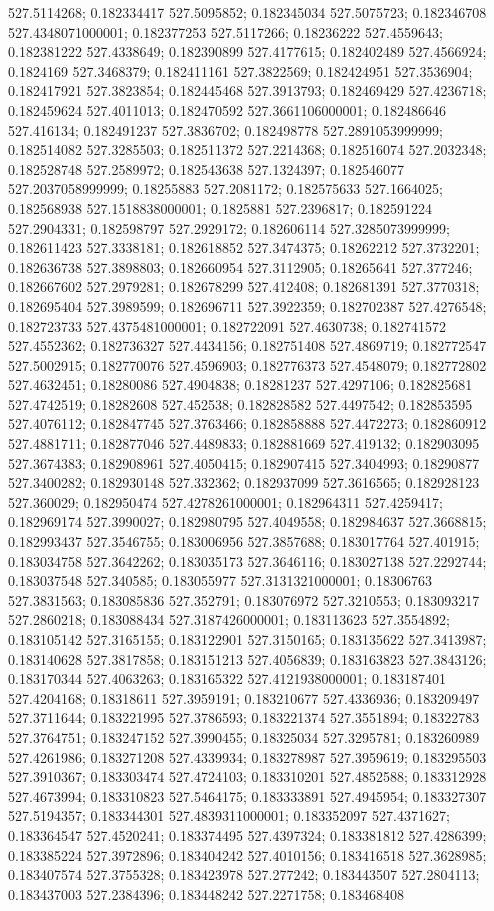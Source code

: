527.5114268; 0.182334417 527.5095852; 0.182345034 527.5075723; 0.182346708 527.4348071000001; 0.182377253 527.5117266; 0.18236222 527.4559643; 0.182381222 527.4338649; 0.182390899 527.4177615; 0.182402489 527.4566924; 0.1824169 527.3468379; 0.182411161 527.3822569; 0.182424951 527.3536904; 0.182417921 527.3823854; 0.182445468 527.3913793; 0.182469429 527.4236718; 0.182459624 527.4011013; 0.182470592 527.3661106000001; 0.182486646 527.416134; 0.182491237 527.3836702; 0.182498778 527.2891053999999; 0.182514082 527.3285503; 0.182511372 527.2214368; 0.182516074 527.2032348; 0.182528748 527.2589972; 0.182543638 527.1324397; 0.182546077 527.2037058999999; 0.18255883 527.2081172; 0.182575633 527.1664025; 0.182568938 527.1518838000001; 0.1825881 527.2396817; 0.182591224 527.2904331; 0.182598797 527.2929172; 0.182606114 527.3285073999999; 0.182611423 527.3338181; 0.182618852 527.3474375; 0.18262212 527.3732201; 0.182636738 527.3898803; 0.182660954 527.3112905; 0.18265641 527.377246; 0.182667602 527.2979281; 0.182678299 527.412408; 0.182681391 527.3770318; 0.182695404 527.3989599; 0.182696711 527.3922359; 0.182702387 527.4276548; 0.182723733 527.4375481000001; 0.182722091 527.4630738; 0.182741572 527.4552362; 0.182736327 527.4434156; 0.182751408 527.4869719; 0.182772547 527.5002915; 0.182770076 527.4596903; 0.182776373 527.4548079; 0.182772802 527.4632451; 0.18280086 527.4904838; 0.18281237 527.4297106; 0.182825681 527.4742519; 0.18282608 527.452538; 0.182828582 527.4497542; 0.182853595 527.4076112; 0.182847745 527.3763466; 0.182858888 527.4472273; 0.182860912 527.4881711; 0.182877046 527.4489833; 0.182881669 527.419132; 0.182903095 527.3674383; 0.182908961 527.4050415; 0.182907415 527.3404993; 0.18290877 527.3400282; 0.182930148 527.332362; 0.182937099 527.3616565; 0.182928123 527.360029; 0.182950474 527.4278261000001; 0.182964311 527.4259417; 0.182969174 527.3990027; 0.182980795 527.4049558; 0.182984637 527.3668815; 0.182993437 527.3546755; 0.183006956 527.3857688; 0.183017764 527.401915; 0.183034758 527.3642262; 0.183035173 527.3646116; 0.183027138 527.2292744; 0.183037548 527.340585; 0.183055977 527.3131321000001; 0.18306763 527.3831563; 0.183085836 527.352791; 0.183076972 527.3210553; 0.183093217 527.2860218; 0.183088434 527.3187426000001; 0.183113623 527.3554892; 0.183105142 527.3165155; 0.183122901 527.3150165; 0.183135622 527.3413987; 0.183140628 527.3817858; 0.183151213 527.4056839; 0.183163823 527.3843126; 0.183170344 527.4063263; 0.183165322 527.4121938000001; 0.183187401 527.4204168; 0.18318611 527.3959191; 0.183210677 527.4336936; 0.183209497 527.3711644; 0.183221995 527.3786593; 0.183221374 527.3551894; 0.18322783 527.3764751; 0.183247152 527.3990455; 0.18325034 527.3295781; 0.183260989 527.4261986; 0.183271208 527.4339934; 0.183278987 527.3959619; 0.183295503 527.3910367; 0.183303474 527.4724103; 0.183310201 527.4852588; 0.183312928 527.4673994; 0.183310823 527.5464175; 0.183333891 527.4945954; 0.183327307 527.5194357; 0.183344301 527.4839311000001; 0.183352097 527.4371627; 0.183364547 527.4520241; 0.183374495 527.4397324; 0.183381812 527.4286399; 0.183385224 527.3972896; 0.183404242 527.4010156; 0.183416518 527.3628985; 0.183407574 527.3755328; 0.183423978 527.277242; 0.183443507 527.2804113; 0.183437003 527.2384396; 0.183448242 527.2271758; 0.183468408 